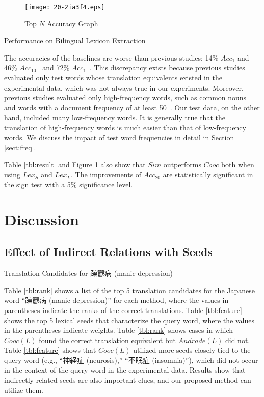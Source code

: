 \documentclass[english]{jnlp_1.4}
\begin{document}
\begin{figure}[t]
\begin{center}
\texttt{[image: 20-2ia3f4.eps]}
\end{center}
\caption{Top {$N$} Accuracy Graph}
\label{fig:result}
\end{figure}
\begin{table}[t]
\caption{Performance on Bilingual Lexicon Extraction}
\label{tbl:result}

\end{table}

The accuracies of the baselines are worse than previous studies: 14\% $\mathit{Acc}_{1}$ and 46\% $\mathit{Acc}_{10}$~\cite{andrade10} and 72\% $\mathit{Acc}_{1}$~\cite{rapp99}. 
This discrepancy exists because previous studies evaluated only test words whose translation equivalents existed in the experimental data, which was not always true in our experiments. 
Moreover, previous studies evaluated only high-frequency words, such as common nouns~\cite{rapp99} and words with a document frequency of at least 50~\cite{andrade10}. 
Our test data, on the other hand, included many low-frequency words. 
It is generally true that the translation of high-frequency words is much easier than that of low-frequency words. We discuss the impact of test word frequencies in detail in Section \ref{sect:freq}. 

Table \ref{tbl:result} and Figure \ref{fig:result} also show that $\mathit{Sim}$ outperforms $\mathit{Cooc}$ both when using $\mathit{Lex}_{S}$ and $\mathit{Lex}_{L}$. 
The improvements of $\mathit{Acc}_{20}$ are statistically significant in the sign test with a 5\% significance level. 


\section{Discussion}
\label{sect:discuss}


\subsection{Effect of Indirect Relations with Seeds}
\label{sect:casestudy}

\begin{table}[b]
\caption{Translation Candidates for 躁鬱病 (manic-depression)}
\label{tbl:rank}

\end{table}

Table \ref{tbl:rank} shows a list of the top 5 translation candidates for the Japanese word ``躁鬱病 (manic-depression)'' for each method, where the values in parentheses indicate the ranks of the correct translations. 
Table \ref{tbl:feature} shows the top 5 lexical seeds that characterize the query word, where the values in the parentheses indicate weights. 
Table \ref{tbl:rank} shows cases in which $\mathit{Cooc}(L)$ found the correct translation equivalent but $\mathit{Andrade}(L)$ did not. 
Table \ref{tbl:feature} shows that $\mathit{Cooc}(L)$ utilized more seeds closely tied to the query word (e.g., ``神経症 (neurosis),'' ``不眠症 (insomnia)''), which did not occur in the context of the query word in the experimental data. 
Results show that indirectly related seeds are also important clues, and our proposed method can utilize them. 
\end{document}
